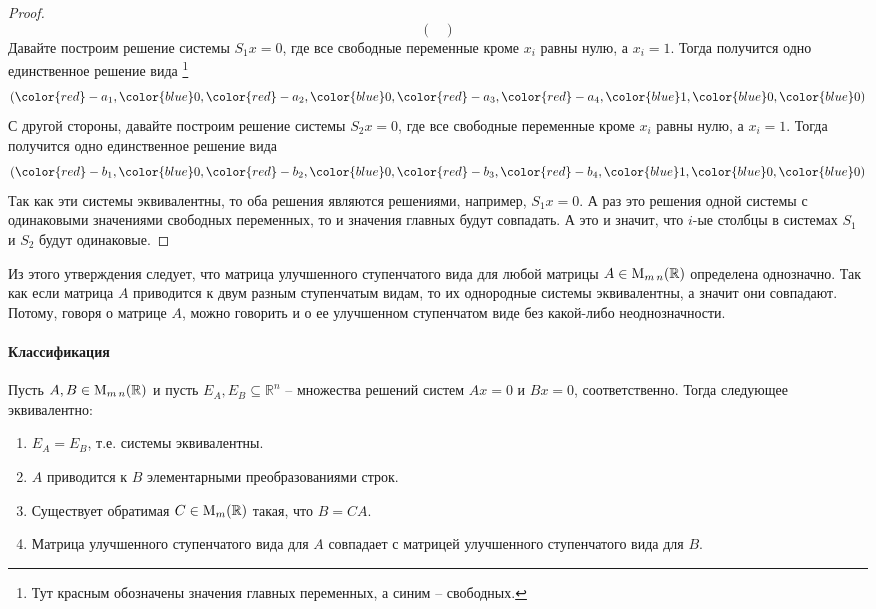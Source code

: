 \begin{proof}
\[\begin{pmatrix}
\end{pmatrix}
\]
Давайте построим решение системы $S_1 x = 0$, где все свободные переменные кроме $x_i$ равны нулю, а $x_i = 1$.
Тогда получится одно единственное решение вида%
\footnote{Тут красным обозначены значения главных переменных, а синим -- свободных.}
\[
({\color{red} -a_1}, {\color{blue} 0}, {\color{red} -a_2}, {\color{blue} 0}, {\color{red} -a_3}, {\color{red} -a_4}, {\color{blue} 1}, {\color{blue} 0}, {\color{blue} 0})
\]
С другой стороны, давайте построим решение системы $S_2 x = 0$, где все свободные переменные кроме $x_i$ равны нулю, а $x_i = 1$.
Тогда получится одно единственное решение вида
\[
({\color{red} -b_1}, {\color{blue} 0}, {\color{red} -b_2}, {\color{blue} 0}, {\color{red} -b_3}, {\color{red} -b_4}, {\color{blue} 1}, {\color{blue} 0}, {\color{blue} 0})
\]
Так как эти системы эквивалентны, то оба решения являются решениями, например, $S_1x = 0$.
А раз это решения одной системы с одинаковыми значениями свободных переменных, то и значения главных будут совпадать.
А это и значит, что $i$-ые столбцы в системах $S_1$ и $S_2$ будут одинаковые.
\end{proof}

Из этого утверждения следует, что матрица улучшенного ступенчатого вида для любой матрицы $A\in\operatorname{M}_{m\,n}(\mathbb R)$ определена однозначно.
Так как если матрица $A$ приводится к двум разным ступенчатым видам, то их однородные системы эквивалентны, а значит они совпадают.
Потому, говоря о матрице $A$, можно говорить и о ее улучшенном ступенчатом виде без какой-либо неоднозначности.

\paragraph{Классификация}

\begin{claim}
Пусть $A,B\in\operatorname{M}_{m\,n}(\mathbb R)$ и пусть $E_A, E_B\subseteq \mathbb R^n$ -- множества решений систем $Ax = 0$ и $Bx = 0$, соответственно.
Тогда следующее эквивалентно:
\begin{enumerate}
\item $E_A = E_B$, т.е. системы эквивалентны.

\item $A$ приводится к $B$ элементарными преобразованиями строк.

\item Существует обратимая $C\in\operatorname{M}_{m}(\mathbb R)$ такая, что $B = CA$.

\item Матрица улучшенного ступенчатого вида для $A$ совпадает с матрицей улучшенного ступенчатого вида для $B$.
\end{enumerate}
\end{claim}


